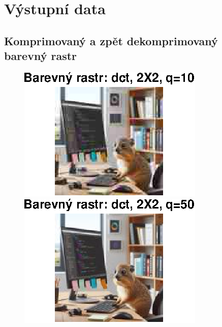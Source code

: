 \section*{Výstupní data}

\subsection*{Komprimovaný a zpět dekomprimovaný barevný rastr}
\begin{figure}[H]
    \centering
    \begin{minipage}[b]{0.3\textwidth}
        \centering
        \includegraphics[width=\textwidth]{images/barevny_dct_2X2_q10.eps}
    \end{minipage}
    \hfill
    \begin{minipage}[b]{0.3\textwidth}
        \centering
        \includegraphics[width=\textwidth]{images/barevny_dct_2X2_q50.eps}

\end{minipage}
\end{figure}
